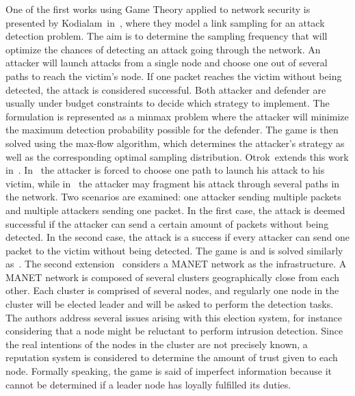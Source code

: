  One of the first works using Game Theory applied to network security is presented by Kodialam~\etal in~\cite{MuraliKodialam2003}, where they model a link sampling for an attack detection problem.
 The aim is to determine the sampling frequency that will optimize the chances of detecting an attack going through the network.
 An attacker will launch attacks from a single node and choose one out of several paths to reach the victim's node.
 If one packet reaches the victim without being detected, the attack is considered successful.
 Both attacker and defender are usually under budget constraints to decide which strategy to implement.
 The formulation is represented as a minmax problem where the attacker will minimize the maximum detection probability possible for the defender.
 The game is then solved using the max-flow algorithm, which determines the attacker's strategy as well as the corresponding optimal sampling distribution.
 Otrok~\etal extends this work in~\cite{otrok1,otrok2}.
 In~\cite{MuraliKodialam2003} the attacker is forced to choose one path to launch his attack to his victim, while in~\cite{otrok1} the attacker may fragment his attack through several paths in the network.
 Two scenarios are examined: one attacker sending multiple packets and multiple attackers sending one packet.
 In the first case, the attack is deemed successful if the attacker can send a certain amount of packets without being detected.
 In the second case, the attack is a success if every attacker can send one packet to the victim without being detected.
 The game is and is solved similarly as~\cite{MuraliKodialam2003}.
 The second extension~\cite{otrok2} considers a MANET network as the infrastructure.
 A MANET network is composed of several clusters geographically close from each other.
 Each cluster is comprised of several nodes, and regularly one node in the cluster will be elected leader and will be asked to perform the detection tasks. The authors address several issues arising with this election system, for instance considering that a node might be reluctant to perform intrusion detection.
 Since the real intentions of the nodes in the cluster are not precisely known, a reputation system is considered to determine the amount of trust given to each node.
 Formally speaking, the game is said of imperfect information because it cannot be determined if a leader node has loyally fulfilled its duties.
 
